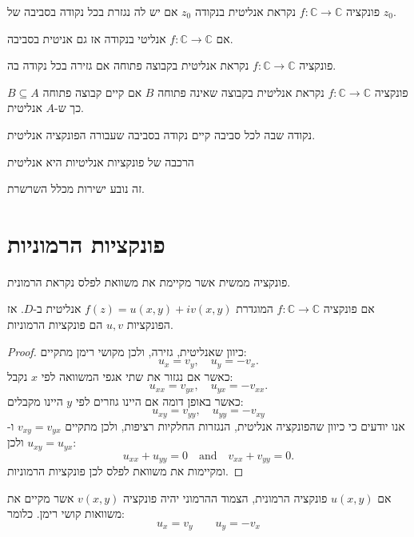 \documentclass{tstextbook}
\begin{document}
\begin{definition}
פונקציה \(f:\mathbb{C}\to \mathbb{C}\) נקראת אנליטית בנקודה \(z_{0}\) אם יש לה נגזרת בכל נקודה בסביבה של \(z_{0}\).

\end{definition}
\begin{corollary}
אם \(f:\mathbb{C}\to\mathbb{C}\) אנליטי בנקודה אז גם אניטית בסביבה.

\end{corollary}
\begin{definition}
פונקציה \(f:\mathbb{C}\to \mathbb{C}\) נקראת אנליטית בקבוצה פתוחה אם גזירה בכל נקודה בה.

\end{definition}
\begin{definition}
פונקציה \(f:\mathbb{C}\to \mathbb{C}\) נקראת אנליטית בקבוצה שאינה פתוחה \(B\) אם קיים קבוצה פתוחה \(B\subseteq A\) כך ש-\(A\) אנליטית.

\end{definition}
\begin{definition}
נקודה שבה לכל סביבה קיים נקודה בסביבה שעבורה הפונקציה אנליטית.

\end{definition}
\begin{proposition}
הרכבה של פונקציות אנליטיות היא אנליטית

\end{proposition}
זה נובע ישירות מכלל השרשרת.

\section{פונקציות הרמוניות}

\begin{definition}
פונקציה ממשית אשר מקיימת את משוואת לפלס נקראת הרמונית.

\end{definition}
\begin{theorem}
אם פונקציה \(f:\mathbb{C}\to \mathbb{C}\) המוגדרת \(f(z)=u(x,y)+iv(x,y)\) אנליטית ב-\(D\). אז הפונקציות \(u,v\) הם פונקציות הרמוניות.

\end{theorem}
\begin{proof}
כיוון שאנליטית, גזירה, ולכן מקושי רימן מתקיים:
$$u_{x}=v_{y},\quad u_{y}=-v_{x}.$$
כאשר אם נגזור את שתי אגפי המשוואה לפי \(x\) נקבל:
$$u_{x x}=v_{y x},\quad u_{y x}=-v_{x x}.$$
כאשר באופן דומה אם היינו גוזרים לפי \(y\) היינו מקבלים:
$$u_{x y}=v_{y y},\quad u_{y y}=-v_{x y}$$
אנו יודעים כי כיוון שהפונקציה אנליטית, הנגזרות החלקיות רציפות, ולכן מתקיים \(v_{xy}=v_{yx}\) ו-\(u_{xy}=u_{yx}\) ולכן:
$$u_{x x}+u_{y y}=0\quad{\mathrm{and}}\quad v_{x x}+v_{y y}=0.$$
ומקיימות את משוואת לפלס לכן פונקציות הרמוניות.

\end{proof}
\begin{definition}
אם \(u(x,y)\) פונקציה הרמונית, הצמוד ההרמוני יהיה פונקציה \(v(x,y)\) אשר מקיים את משוואות קושי רימן. כלומר:
$$u_{x}=v_{y}\qquad u_{y}=-v_{x}$$

\end{definition}
\end{document}

